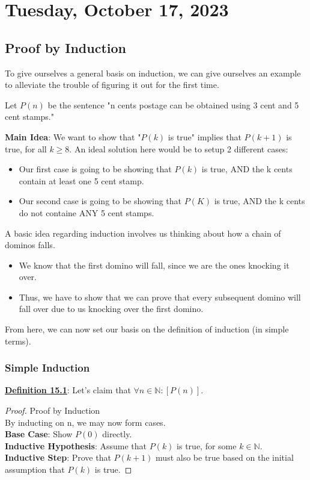 \section{Tuesday, October 17, 2023}

\subsection{Proof by Induction}

To give ourselves a general basis on induction, we can give ourselves an example to alleviate the trouble of figuring it out for the first time.

Let $P(n)$ be the sentence "n cents postage can be obtained using 3 cent and 5 cent stamps."

\textbf{Main Idea}: We want to show that "$P(k)$ is true" implies that $P(k+1)$ is true, for all $k \geq 8$. An ideal solution here would be to setup 2 different cases:

\begin{itemize}
	\item Our first case is going to be showing that $P(k)$ is true, AND the k cents contain at least one 5 cent stamp.
	\item Our second case is going to be showing that $P(K)$ is true, AND the k cents do not containe ANY 5 cent stamps.
\end{itemize}

A basic idea regarding induction involves us thinking about how a chain of dominos falls. 

\begin{itemize}
	\item We know that the first domino will fall, since we are the ones knocking it over.
	\item Thus, we have to show that we can prove that every subsequent domino will fall over due to us knocking over the first domino.
\end{itemize}

From here, we can now set our basis on the definition of induction (in simple terms).

\subsubsection{Simple Induction}
\textbf{\underline{Definition 15.1}}: Let's claim that $\forall n \in \mathbb{N} : [P(n)]$.

\begin{proof}
	Proof by Induction\\
	By inducting on n, we may now form cases.\\
	\textbf{Base Case}: Show $P(0)$ directly.\\
	\textbf{Inductive Hypothesis}: Assume that $P(k)$ is true, for some $k \in \mathbb{N}$.\\
	\textbf{Inductive Step}: Prove that $P(k+1)$ must also be true based on the initial assumption that $P(k)$ is true.
\end{proof}

